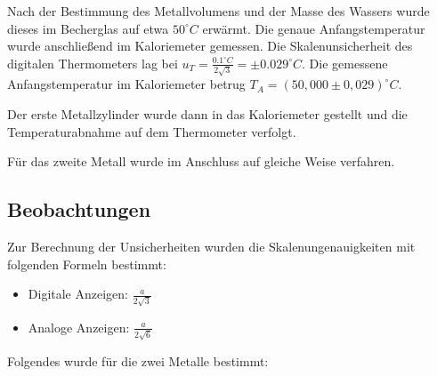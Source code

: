 \documentclass[
  9pt,
]{article}
\begin{document}
Nach der Bestimmung des Metallvolumens und der Masse des Wassers wurde
dieses im Becherglas auf etwa \(50^\circ C\) erwärmt. Die genaue
Anfangstemperatur wurde anschließend im Kaloriemeter gemessen. Die
Skalenunsicherheit des digitalen Thermometers lag bei
\(u_T = \frac{0.1^\circ C}{2\sqrt{3}} = \pm0.029^\circ C\). Die
gemessene Anfangstemperatur im Kaloriemeter betrug
\(T_A=(50,000\pm 0,029)^\circ C\).

Der erste Metallzylinder wurde dann in das Kaloriemeter gestellt und die
Temperaturabnahme auf dem Thermometer verfolgt.

Für das zweite Metall wurde im Anschluss auf gleiche Weise verfahren.

\hypertarget{beobachtungen-1}{%
\subsection{Beobachtungen}\label{beobachtungen-1}}

Zur Berechnung der Unsicherheiten wurden die Skalenungenauigkeiten mit
folgenden Formeln bestimmt:

\begin{itemize}
  \item Digitale Anzeigen: $\frac{a}{2\sqrt{3}}$
  \item Analoge Anzeigen: $\frac{a}{2\sqrt{6}}$
\end{itemize}

Folgendes wurde für die zwei Metalle bestimmt:
\end{document}
